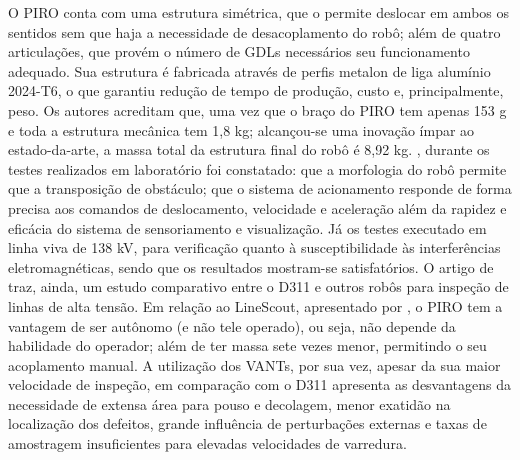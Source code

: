 O PIRO conta com uma estrutura simétrica, que o permite deslocar em ambos os sentidos sem que haja a necessidade de desacoplamento do robô; além de quatro articulações, que provém o número de GDLs necessários seu funcionamento adequado. Sua estrutura é fabricada através de perfis metalon de liga alumínio 2024-T6, o que garantiu redução de tempo de produção, custo e, principalmente, peso. Os autores acreditam que, uma vez que o braço do PIRO tem apenas 153 g e toda a estrutura mecânica tem 1,8 kg; alcançou-se uma inovação ímpar ao estado-da-arte, a massa total da estrutura final do robô é 8,92 kg.
, durante os testes realizados em laboratório foi constatado: que a morfologia do robô permite que a transposição de obstáculo; que o sistema de acionamento responde de forma precisa aos comandos de deslocamento, velocidade e aceleração além da rapidez e eficácia do sistema de sensoriamento e visualização. Já os testes executado em linha viva de 138 kV, para verificação quanto à susceptibilidade às interferências eletromagnéticas, sendo que os resultados mostram-se satisfatórios. 
O artigo de  traz, ainda, um estudo comparativo entre o D311 e outros robôs para inspeção de linhas de alta tensão. Em relação ao LineScout, apresentado por  , o PIRO tem a vantagem de ser autônomo (e não tele operado), ou seja, não depende da habilidade do operador; além de ter massa sete vezes menor, permitindo o seu acoplamento manual. A utilização dos VANTs, por sua vez, apesar da sua maior velocidade de inspeção, em comparação com o D311 apresenta as desvantagens da necessidade de extensa área para pouso e decolagem, menor exatidão na localização dos defeitos, grande influência de perturbações externas e taxas de amostragem insuficientes para elevadas velocidades de varredura.

